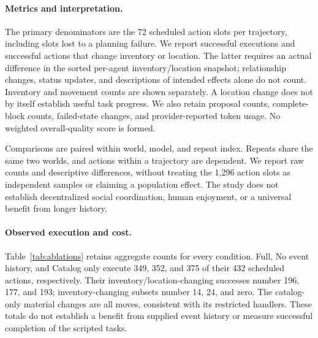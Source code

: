 \paragraph{Metrics and interpretation.}
The primary denominators are the 72 scheduled action slots per trajectory,
including slots lost to a planning failure. We report successful executions
and successful actions that change inventory or location. The latter requires
an actual difference in the sorted per-agent inventory/location snapshot;
relationship changes, status updates, and descriptions of intended effects
alone do not count. Inventory and movement counts are shown separately.
A location change does not by itself establish useful task progress. We also
retain proposal counts, complete-block counts, failed-state changes, and
provider-reported token usage. No weighted overall-quality score is formed.

Comparisons are paired within world, model, and repeat index. Repeats share
the same two worlds, and actions within a trajectory are dependent. We report
raw counts and descriptive differences, without treating the 1,296 action
slots as independent samples or claiming a population effect. The study does
not establish decentralized social coordination, human enjoyment, or a
universal benefit from longer history.

\begin{table}[t]
\centering\small
\setlength{\tabcolsep}{4pt}

\caption{Aggregate planner diagnostics on two fixed worlds. Each row has
432 scheduled action slots across six trajectories. Success counts executed
actions; Material counts actual inventory or location changes among successes;
Inventory is its inventory-changing subset. Status and relationship changes
alone do not count as material.}
\label{tab:ablations}
\end{table}

\begin{table}[t]
\centering\small
\setlength{\tabcolsep}{4pt}

\caption{All 18 formal trajectories. Each trajectory has 72 planned action
slots. Material counts successful actions with actual inventory or location
changes; Inventory and Move separate these consequences. Proposals counts
successfully executed proposals. Repeats share a frozen world and are not
independent world samples. Pilot runs are excluded.}
\label{tab:ablation-detail}
\end{table}

\paragraph{Observed execution and cost.}
Table~\ref{tab:ablations} retains aggregate counts for every condition.
Full, No event history, and Catalog only execute 349, 352, and 375 of their
432 scheduled actions, respectively. Their inventory/location-changing
successes number 196, 177, and 193; inventory-changing subsets number 14,
24, and zero. The catalog-only material changes are all moves, consistent
with its restricted handlers. These totals do not establish a benefit from
supplied event history or measure successful completion of the scripted tasks.

